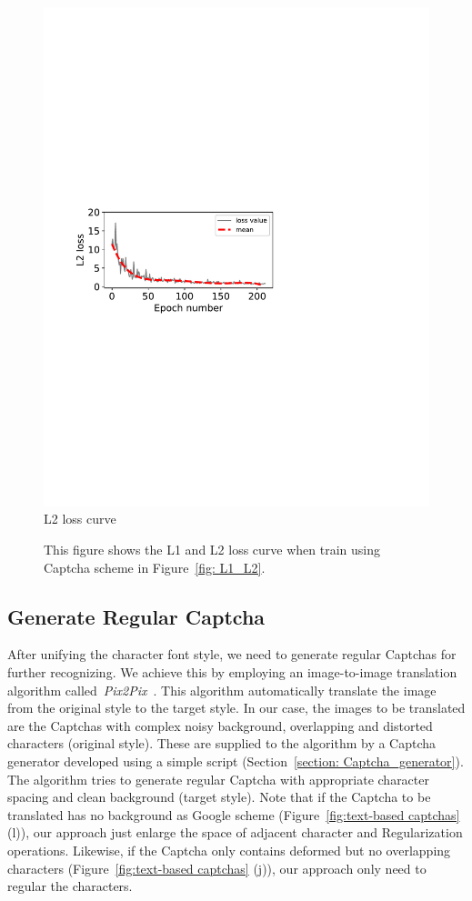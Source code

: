 \begin{figure}
{\begin{minipage}[t]{0.22\textwidth}
      \includegraphics[width=\textwidth]{fig/loss_anlysis/loss_L2.pdf}\\
      \center L2 loss curve
      \end{minipage}
  }
  \caption{This figure shows the L1 and L2 loss curve when train using Captcha scheme in Figure~\ref{fig: L1_L2}.}
  \label{fig: loss_anlysis}
\end{figure}

\subsection{Generate Regular Captcha}
After unifying the character font style, we need to generate regular Captchas for further recognizing. We achieve this by employing an image-to-image translation algorithm called~\emph{Pix2Pix}~\cite{Pix2PixCode}. This algorithm automatically translate the image from the original style to the target style. In our case, the images to be translated are the Captchas with complex noisy background, overlapping and distorted characters (original style). These are supplied to the algorithm by a Captcha generator developed using a simple script (Section~\ref{section: Captcha_generator}). The algorithm tries to generate regular Captcha with appropriate character spacing and clean background (target style).
Note that if the Captcha to be translated has no background as Google scheme (Figure~\ref{fig:text-based captchas} (l)), our approach just enlarge the space of adjacent character and Regularization operations. Likewise, if the Captcha only contains deformed but no overlapping characters (Figure~\ref{fig:text-based captchas} (j)), our approach only need to regular the characters.

